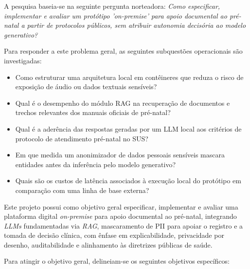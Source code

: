 \documentclass[12pt]{article}
\begin{document}

A pesquisa baseia-se na seguinte pergunta norteadora: \textit{Como especificar, implementar e avaliar um protótipo 'on-premise' para apoio documental ao pré-natal a partir de protocolos públicos, sem atribuir autonomia decisória ao modelo generativo?}

Para responder a este problema geral, as seguintes subquestões operacionais são investigadas:
\begin{itemize}
  \item Como estruturar uma arquitetura local em contêineres que reduza o risco de exposição de áudio ou dados textuais sensíveis?
  \item Qual é o desempenho do módulo RAG na recuperação de documentos e trechos relevantes dos manuais oficiais de pré-natal?
	\item Qual é a aderência das respostas geradas por um LLM local aos critérios de protocolo de atendimento pré-natal no SUS?
	\item Em que medida um anonimizador de dados pessoais sensíveis mascara entidades antes da inferência pelo modelo generativo?
	\item Quais são os custos de latência associados à execução local do protótipo em comparação com uma linha de base externa?
\end{itemize}


Este projeto possui como objetivo geral especificar, implementar e avaliar uma plataforma digital \textit{on-premise} para apoio documental ao pré-natal, integrando \textit{LLMs} fundamentadas via \textit{RAG}, mascaramento de PII para apoiar o registro e a tomada de decisão clínica, com ênfase em explicabilidade, privacidade por desenho, auditabilidade e alinhamento às diretrizes públicas de saúde.


Para atingir o objetivo geral, delineiam-se os seguintes objetivos específicos:
\end{document}
